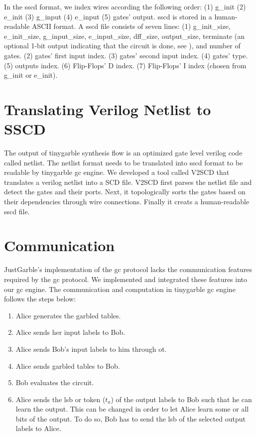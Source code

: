 In the \acrshort{sscd} format, we index wires according the following order: (1) g\_init (2) e\_init (3) g\_input (4) e\_input (5) gates' output.
\acrshort{sscd} is stored in a human-readable ASCII format.
A \acrshort{sscd} file consists of seven lines: (1) g\_init\_size, e\_init\_size, g\_input\_size, e\_input\_size, dff\_size, output\_size, terminate (an optional 1-bit output indicating that the circuit is done, see ), and number of gates. (2) gates' first input index. (3) gates' second input index. (4) gates' type. (5) outputs index. (6) Flip-Flops' D index. (7) Flip-Flops' I index (chosen from g\_init or e\_init).

\section{Translating Verilog Netlist to SSCD}\label{sec:engine-v2sscd}
The output of \gls{tinygarble} synthesis flow is an optimized gate level \gls{verilog} code called netlist.
The netlist format needs to be translated into \acrshort{sscd} format to be readable by \gls{tinygarble} \acrshort{gc} engine.
We developed a tool called V2SCD that translates a \gls{verilog} netlist into a SCD file.
V2SCD first parses the netlist file and detect the gates and their ports.
Next, it topologically sorts the gates based on their dependencies through wire connections.
Finally it creats a human-readable \acrshort{sscd} file.

\section{Communication}\label{sec:engine-comm}
JustGarble's implementation of the \acrshort{gc} protocol lacks the communication features required by the \acrshort{gc} protocol.
We implemented and integrated these features into our \acrshort{gc} engine.
The communication and computation in \gls{tinygarble} \acrshort{gc} engine follows the steps below:
\begin{enumerate}
\item Alice generates the garbled tables.
\item Alice sends her input labels to Bob.
\item Alice sends Bob's input labels to him through \acrshort{ot}.
\item Alice sends garbled tables to Bob.
\item Bob evaluates the circuit.
\item Alice sends the \acrfull{lsb} or token (${t}_a$) of the output labels to Bob such that he can learn the output.
  This can be changed in order to let Alice learn some or all bits of the output.
  To do so, Bob has to send the \acrshort{lsb} of the selected output labels to Alice.
\end{enumerate}

